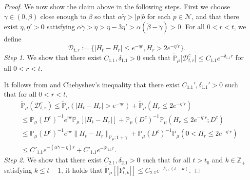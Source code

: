\documentclass[12pt,a4paper]{amsart}
\theoremstyle{plain}
\theoremstyle{definition}
\numberwithin{equation}{section}
\begin{document}
\begin{proof}
  We now show the claim above in the following steps.
  First we choose $\gamma\in(0, \beta)$ close enough to $\beta$ so that $\alpha \tilde \gamma > |p|b$ for each $p\in \mathcal N$,
  and that there exist $\eta,\eta'>0$ satisfying $\alpha \tilde \gamma > \eta>\eta - 3\eta'> \alpha (\tilde \beta - \tilde \gamma)>0$.
  For all $0<r<t$, we define
\[
\mathcal{D}_{t,r} :=\{|H_t-H_{r}|\leq  e^{-\eta r}, H_{r}> 2e^{-\eta' r}\}.
\]
 \emph{Step 1.} We show that there exist $C_{1.1},\delta_{1.1} >0$ such that
$\mathbb{\widetilde{P}}_{\mu} \big[ \mathcal{D}^c_{t,r} \big] \leq C_{1.1} e^{-\delta_{1.1} r}$ for all $0<r<t$.


 It follows from \cite[Proposition 2.10 \& Lemma 3.3 with $|p|=0$]{RenSongSunZhao2019Stable} and Chebyshev's inequality that there exist $C_{1.1}', \delta_{1.1}'>0$ such that for all
  $0<r<t$,
  \begin{align}
    & \mathbb{\widetilde{P}}_{\mu}(\mathcal{D}_{t,r}^c)
    \leq \mathbb{\widetilde{P}}_{\mu}(|H_t-H_{r}| > e^{-\eta r})+\mathbb{\widetilde{P}}_{\mu}(H_{r}\leq 2e^{-\eta'r}) \\
    & \leq \mathbb{P}_{\mu}(D^c)^{-1}e^{\eta r}\mathbb{P}_{\mu}[|H_t-H_r|] +  \mathbb{P}_{\mu}(D^c)^{-1} \mathbb P_\mu(H_r\leq 2e^{-\eta'r}; D^c) \\
    & \leq \mathbb{P}_{\mu}(D^c)^{-1}  e^{\eta r}\|H_t - H_r\|_{\mathbb P_\mu; 1+\gamma} + \mathbb{P}_{\mu}(D^c)^{-1} \mathbb P_\mu(0<H_r\leq 2e^{-\eta'r}) \\
    & \leq C'_{1.1} e^{-(\alpha \tilde \gamma - \eta)r}+C'_{1.1} e^{-\delta'_{1.1}r}.
  \end{align}
  \emph{Step 2.} We show that there exist $C_{2.1},\delta_{2.1} > 0$ such that for all $t>t_0$ and $k\in \mathbb Z_+$ satisfying $k\leq t-1$, it holds that $ \mathbb{\widetilde{P}}_{\mu} [|Y^s_{t,k}|] \leq  C_{2.1} e^{-\delta_{2.1} (t-k)}$.


\end{proof}
\end{document}
